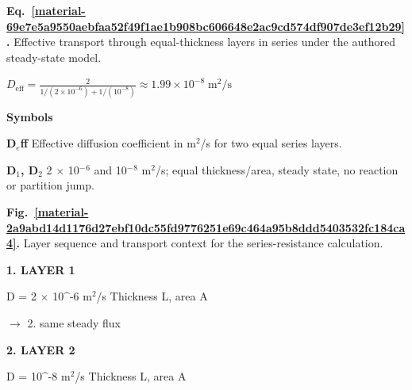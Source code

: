 \documentclass[11pt,a4paper]{article}
\begin{document}
\par\medskip
\begin{samepage}
\label{material-69e7e5a9550aebfaa52f49f1ae1b908bc606648e2ac9cd574df907de3ef12b29}
\noindent\textbf{Eq.~\ref*{material-69e7e5a9550aebfaa52f49f1ae1b908bc606648e2ac9cd574df907de3ef12b29}.} Effective transport through equal-thickness layers in series under the authored steady-state model.\par\nopagebreak
\begin{center}\begin{adjustbox}{max width=\linewidth}$\displaystyle D_{\mathrm{eff}}=\frac{2}{1/(2\times10^{-6})+1/(10^{-8})}\approx1.99\times10^{-8}\;\mathrm{m^2/s}$\end{adjustbox}\end{center}

\par\noindent\textbf{Symbols}

\par\noindent\textbf{D\ensuremath{{}_e}ff} Effective diffusion coefficient in m\ensuremath{{}^2}/s for two equal series layers.

\par\noindent\textbf{D\ensuremath{{}_1}, D\ensuremath{{}_2}} 2 \ensuremath{\times} 10\ensuremath{{}^-}\ensuremath{{}^6} and 10\ensuremath{{}^-}\ensuremath{{}^8} m\ensuremath{{}^2}/s; equal thickness/area, steady state, no reaction or partition jump.

\end{samepage}
\medskip

\par\medskip
\Needspace{10cm}
\label{material-2a9abd14d1176d27ebf10dc55fd9776251e69c464a95b8ddd5403532fc184ca4}
\noindent\textbf{Fig.~\ref*{material-2a9abd14d1176d27ebf10dc55fd9776251e69c464a95b8ddd5403532fc184ca4}.} Layer sequence and transport context for the series-resistance calculation.\par\nopagebreak
\par\medskip\noindent\textcolor{pcd1}{\textbf{1. LAYER 1}}\par
D = 2 \ensuremath{\times} 10\textasciicircum{}-6 m\ensuremath{{}^2}/s
Thickness L, area A

\par\noindent $\longrightarrow$ 2. same steady flux
\par\medskip\noindent\textcolor{pcd2}{\textbf{2. LAYER 2}}\par
D = 10\textasciicircum{}-8 m\ensuremath{{}^2}/s
Thickness L, area A
\end{document}
